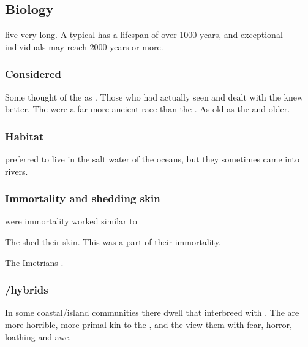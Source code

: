 \subsection{Biology}
\Nagae{} live very long. A typical \naga{} has a lifespan of over 1000 years, and exceptional individuals may reach 2000 years or more. 





\subsubsection{Considered \demiscathae}
Some thought of the \nagae as .
Those who had actually seen and dealt with the \nagae knew better.
The \nagae were a far more ancient race than the \scathae. 
As old as the \dragons and older. 





\subsubsection{Habitat}
\Nagae preferred to live in the salt water of the oceans, but they sometimes came into rivers. 





\subsubsection{Immortality and shedding skin}
\Nagae were 
\Naga immortality worked similar to 

The \nagae shed their skin.
This was a part of their immortality. 

The Imetrians . 





\subsubsection[Scatha/Naga hybrids]{\Scatha/\naga hybrids}
In some coastal/island communities there dwell \scathae{} that interbreed with \nagae{}. 
The \nagae{} are more horrible, more primal kin to the \scathae, and the \scathae{} view them with fear, horror, loathing and awe. 

